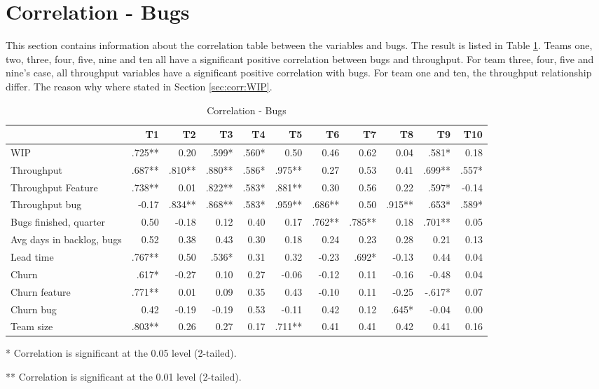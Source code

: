 \documentclass[UKenglish]{ifimaster}  %
\begin{document}
\section{Correlation - Bugs}
\label{sec:corr:bug}
This section contains information about the correlation table between the variables and bugs. The result is listed in Table \ref{corr:bug}. Teams one, two, three, four, five, nine and ten all have a significant positive correlation between bugs and throughput. For team three, four, five and nine's case, all throughput variables have a significant positive correlation with bugs. For team one and ten, the throughput  relationship differ. The reason why where stated in Section \ref{sec:corr:WIP}. 
\begin{table}[!htbp]
 \begin{adjustwidth}{-1.5cm}{}
 \centering
 \begin{tabular}{|l|r|r|r|r|r|r|r|r|r|r|}
\hline
 &  \bf{T1} & \bf{T2} & \bf{T3} & \bf{T4} & \bf{T5} & \bf{T6} & \bf{T7} & \bf{T8} & \bf{T9} & \bf{T10}\\ \hline
WIP &.725**& 0.20& .599*& .560*& 0.50& 0.46& 0.62& 0.04& .581*& 0.18\\ \hline
Throughput &.687**& .810**& .880**& .586*& .975**& 0.27& 0.53& 0.41& .699**& .557*\\ \hline
Throughput Feature &.738**& 0.01& .822**& .583*& .881**& 0.30& 0.56& 0.22& .597*& -0.14\\ \hline
Throughput bug &-0.17& .834**& .868**& .583*& .959**& .686**& 0.50& .915**& .653*& .589*\\ \hline
Bugs finished, quarter &0.50& -0.18& 0.12& 0.40& 0.17& .762**& .785**& 0.18& .701**& 0.05\\ \hline
Avg days in backlog, bugs &0.52& 0.38& 0.43& 0.30& 0.18& 0.24& 0.23& 0.28& 0.21& 0.13\\ \hline
Lead time &.767**& 0.50& .536*& 0.31& 0.32& -0.23& .692*& -0.13& 0.44& 0.04\\ \hline
Churn &.617*& -0.27& 0.10& 0.27& -0.06& -0.12& 0.11& -0.16& -0.48& 0.04\\ \hline
Churn feature &.771**& 0.01& 0.09& 0.35& 0.43& -0.10& 0.11& -0.25& -.617*& 0.07\\ \hline
Churn bug &0.42& -0.19& -0.19& 0.53& -0.11& 0.42& 0.12& .645*& -0.04& 0.00\\ \hline
Team size & .803**
& 0.26& 0.27& 0.17& .711**
& 0.41& 0.41& 0.42& 0.41& 0.16\\ \hline
\end{tabular}
 \caption{Correlation - Bugs}
 \label{corr:bug}
 \centerline {* Correlation is significant at the 0.05 level (2-tailed).}
\centerline{** Correlation is significant at the 0.01 level (2-tailed).}
\end{adjustwidth}
\end{table}
\end{document}
